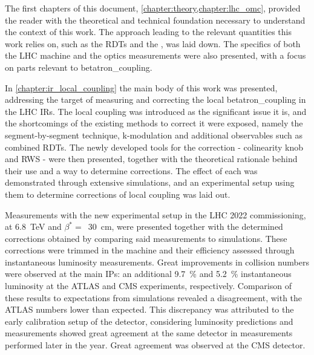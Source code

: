 The first chapters of this document, \cref{chapter:theory,chapter:lhc_omc}, provided the reader with the theoretical and technical foundation necessary to understand the context of this work.
The approach leading to the relevant quantities this work relies on, such as the \glspl{RDT} and the , was laid down.
The specifics of both the \gls{LHC} machine and the \gls{optics} measurements were also presented, with a focus on parts relevant to \gls{betatron_coupling}.

In \cref{chapter:ir_local_coupling} the main body of this work was presented, addressing the target of measuring and correcting the local \gls{betatron_coupling} in the LHC \glspl{IR}.
The local coupling was introduced as the significant issue it is, and the shortcomings of the existing methods to correct it were exposed, namely the segment-by-segment technique, k-modulation and additional observables such as combined \glspl{RDT}.
The newly developed tools for the correction - colinearity knob and \gls{RWS} - were then presented, together with the theoretical rationale behind their use and a way to determine corrections.
The effect of each was demonstrated through extensive simulations, and an experimental setup using them to determine corrections of local coupling was laid out.

Measurements with the new experimental setup in the \gls{LHC} \num{2022} commissioning, at \qty{6.8}{\tera\electronvolt} and \(\beta^{\ast} =\)~\qty{30}{\centi\meter}, were presented together with the determined corrections obtained by comparing said measurements to simulations.
These corrections were trimmed in the machine and their efficiency assessed through instantaneous \gls{luminosity} measurements.
Great improvements in collision numbers were observed at the main \glspl{IP}: an additional \qty{9.7}{\percent} and \qty{5.2}{\percent} instantaneous luminosity at the \acrshort{ATLAS} and \acrshort{CMS} \glspl{experiment}, respectively.
Comparison of these results to expectations from simulations revealed a disagreement, with the \acrshort{ATLAS} numbers lower than expected.
This discrepancy was attributed to the early calibration setup of the detector, considering luminosity predictions and measurements showed great agreement at the same detector in measurements performed later in the year.
Great agreement was observed at the \acrshort{CMS} detector.


